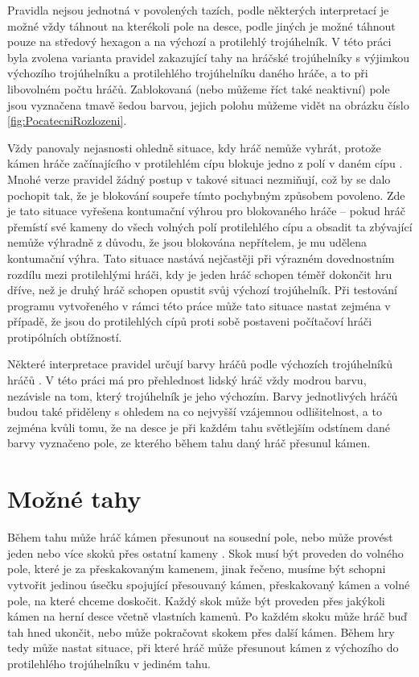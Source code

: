Pravidla nejsou jednotná v povolených tazích, podle některých interpretací je možné vždy táhnout na kterékoli pole na desce, podle jiných je možné táhnout pouze na středový hexagon a na výchozí a protilehlý trojúhelník. V této práci byla zvolena varianta pravidel zakazující tahy na hráčské trojúhelníky s výjimkou výchozího trojúhelníku a protilehlého trojúhelníku daného hráče, a to při libovolném počtu hráčů. Zablokovaná (nebo můžeme říct také neaktivní) pole jsou vyznačena tmavě šedou barvou, jejich polohu můžeme vidět na obrázku číslo \ref{fig:PocatecniRozlozeni}.

Vždy panovaly nejasnosti ohledně situace, kdy hráč nemůže vyhrát, protože kámen hráče začínajícího v protilehlém cípu blokuje jedno z polí v daném cípu \cite{pravidla}. Mnohé verze pravidel žádný postup v takové situaci nezmiňují, což by se dalo pochopit tak, že je blokování soupeře tímto pochybným způsobem povoleno. Zde je tato situace vyřešena kontumační výhrou pro blokovaného hráče -- pokud hráč přemístí své kameny do všech volných polí protilehlého cípu a obsadit ta zbývající nemůže výhradně z důvodu, že jsou blokována nepřítelem, je mu udělena kontumační výhra. Tato situace nastává nejčastěji při výrazném dovednostním rozdílu mezi protilehlými hráči, kdy je jeden hráč schopen téměř dokončit hru dříve, než je druhý hráč schopen opustit svůj výchozí trojúhelník. Při testování programu vytvořeného v rámci této práce může tato situace nastat zejména v případě, že jsou do protilehlých cípů proti sobě postaveni počítačoví hráči protipólních obtížností.

Některé interpretace pravidel určují barvy hráčů podle výchozích trojúhelníků hráčů \cite{zapletal}. V této práci má pro přehlednost lidský hráč vždy modrou barvu, nezávisle na tom, který trojúhelník je jeho výchozím. Barvy jednotlivých hráčů budou také přiděleny s ohledem na co nejvyšší vzájemnou odlišitelnost, a to zejména kvůli tomu, že na desce je při každém tahu světlejším odstínem dané barvy vyznačeno pole, ze kterého během tahu daný hráč přesunul kámen.

\section{Možné tahy}
\label{sec:MozneTahy}
Během tahu může hráč kámen přesunout na sousední pole, nebo může provést jeden nebo více skoků přes ostatní kameny \cite{pravidla}. Skok musí být proveden do volného pole, které je za přeskakovaným kamenem, jinak řečeno, musíme být schopni vytvořit jedinou úsečku spojující přesouvaný kámen, přeskakovaný kámen a volné pole, na které chceme doskočit. Každý skok může být proveden přes jakýkoli kámen na herní desce včetně vlastních kamenů. Po každém skoku může hráč buď tah hned ukončit, nebo může pokračovat skokem přes další kámen. Během hry tedy může nastat situace, při které hráč může přesunout kámen z výchozího do protilehlého trojúhelníku v jediném tahu.

